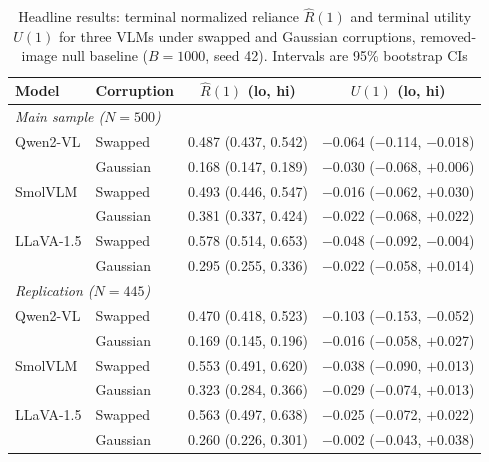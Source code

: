 \begin{table}[tb]
\centering
\caption{Headline results: terminal normalized reliance $\hat{R}(1)$ and
  terminal utility $U(1)$ for three VLMs under swapped and Gaussian
  corruptions, removed-image null baseline ($B=1000$, seed 42).
  Intervals are 95\% bootstrap CIs}
\label{tab:headline}
{\footnotesize\setlength{\tabcolsep}{3pt}%
\begin{tabular}{llcc}
\toprule
\textbf{Model} & \textbf{Corruption} & $\hat{R}(1)$ (lo, hi) & $U(1)$ (lo, hi) \\
\midrule
\multicolumn{4}{l}{\textit{Main sample ($N=500$)}} \\
\midrule
Qwen2-VL  & Swapped  & 0.487 (0.437, 0.542) & $-$0.064 ($-$0.114, $-$0.018) \\
          & Gaussian & 0.168 (0.147, 0.189) & $-$0.030 ($-$0.068, $+$0.006) \\
SmolVLM   & Swapped  & 0.493 (0.446, 0.547) & $-$0.016 ($-$0.062, $+$0.030) \\
          & Gaussian & 0.381 (0.337, 0.424) & $-$0.022 ($-$0.068, $+$0.022) \\
LLaVA-1.5 & Swapped  & 0.578 (0.514, 0.653) & $-$0.048 ($-$0.092, $-$0.004) \\
           & Gaussian & 0.295 (0.255, 0.336) & $-$0.022 ($-$0.058, $+$0.014) \\
\midrule
\multicolumn{4}{l}{\textit{Replication ($N=445$)}} \\
\midrule
Qwen2-VL  & Swapped  & 0.470 (0.418, 0.523) & $-$0.103 ($-$0.153, $-$0.052) \\
          & Gaussian & 0.169 (0.145, 0.196) & $-$0.016 ($-$0.058, $+$0.027) \\
SmolVLM   & Swapped  & 0.553 (0.491, 0.620) & $-$0.038 ($-$0.090, $+$0.013) \\
          & Gaussian & 0.323 (0.284, 0.366) & $-$0.029 ($-$0.074, $+$0.013) \\
LLaVA-1.5 & Swapped  & 0.563 (0.497, 0.638) & $-$0.025 ($-$0.072, $+$0.022) \\
           & Gaussian & 0.260 (0.226, 0.301) & $-$0.002 ($-$0.043, $+$0.038) \\
\bottomrule
\end{tabular}}
\end{table}
